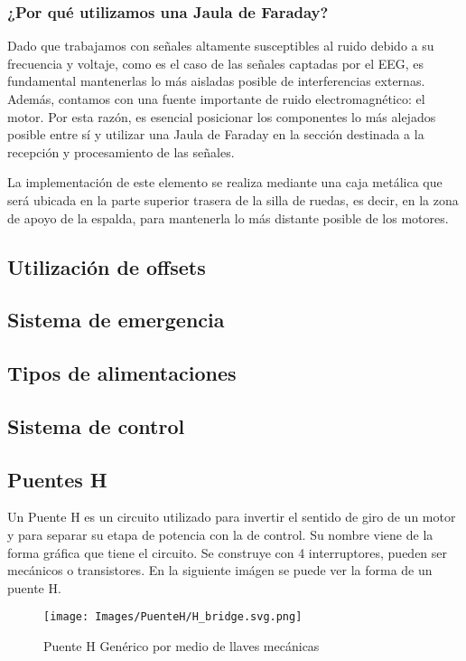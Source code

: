 \documentclass{article}
\begin{document}
\subsubsection{¿Por qué utilizamos una Jaula de Faraday?}
Dado que trabajamos con señales altamente susceptibles al ruido debido a su frecuencia y voltaje, como es el caso de las señales captadas por el EEG, es fundamental mantenerlas lo más aisladas posible de interferencias externas. Además, contamos con una fuente importante de ruido electromagnético: el motor. Por esta razón, es esencial posicionar los componentes lo más alejados posible entre sí y utilizar una Jaula de Faraday en la sección destinada a la recepción y procesamiento de las señales.

La implementación de este elemento se realiza mediante una caja metálica que será ubicada en la parte superior trasera de la silla de ruedas, es decir, en la zona de apoyo de la espalda, para mantenerla lo más distante posible de los motores.

\subsection{Utilización de offsets}

\subsection{Sistema de emergencia}

\subsection{Tipos de alimentaciones}

\subsection{Sistema de control}

\subsection{Puentes H}
Un Puente H es un circuito utilizado para invertir el sentido de giro de un motor y para separar su etapa de potencia con la de control. Su nombre viene de la forma gráfica que tiene el circuito. Se construye con 4 interruptores, pueden ser mecánicos o transistores. En la siguiente imágen se puede ver la forma de un puente H.

\begin{figure}[H]
    \centering
    \texttt{[image: Images/PuenteH/H\_bridge.svg.png]}
    \caption{Puente H Genérico por medio de llaves mecánicas}
\end{figure}
\end{document}
